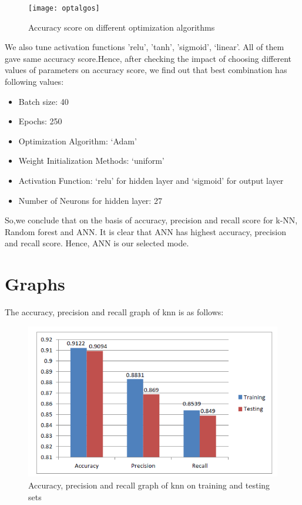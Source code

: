 \begin{figure}[h]
\begin{center}
\texttt{[image: optalgos]}
\caption{Accuracy score on different optimization algorithms}
\label{fig:3}
\end{center}
\end{figure}

We also tune activation functions { 'relu', 'tanh', 'sigmoid', ‘linear’}. All of them gave same accuracy score.Hence, after checking the impact of choosing different values of parameters on accuracy score, we find out that best combination has following values:
\begin{itemize}
\item Batch size: 40
\item Epochs: 250
\item Optimization Algorithm: ‘Adam’
\item Weight Initialization Methods: ‘uniform’
\item Activation Function: ‘relu’ for hidden layer and ‘sigmoid’ for output layer
\item Number of Neurons for hidden layer: 27
\end{itemize}
So,we conclude that on the basis of accuracy, precision and recall score for k-NN, Random forest and ANN. It is clear that ANN has highest accuracy, precision and recall score. Hence, ANN is our selected mode.
\pagebreak

\section{Graphs}

The  accuracy, precision and recall graph of knn is as follows:
\begin{figure}[h]
  		\centering
    		\includegraphics[scale=0.85]{./Figures/knncmgraph}
\caption{Accuracy, precision and recall graph of knn on training and testing sets}
\label{fig:4}
 		\end{figure}

